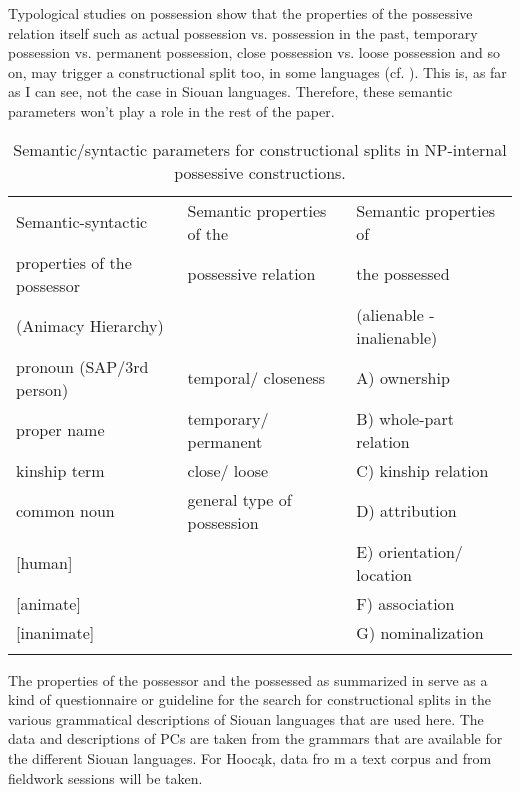 \documentclass[output=paper]{LSP/langsci}
\begin{document}
Typological studies on possession show that the properties of the possessive relation itself such as actual possession vs. possession in the past, temporary possession vs. permanent possession, close possession vs. loose possession and so on, may trigger a constructional split too, in some languages (cf. \citealt[274-6]{Dixon2010}). This is, as far as I can see, not the case in Siouan languages. Therefore, these semantic parameters won't play a role in the rest of the paper. 

\begin{table}
\caption{Semantic/syntactic parameters for constructional splits in NP-internal possessive constructions.} \label{parameters}
\small
\begin{tabular}[h]{ l l l }

\lsptoprule
Semantic-syntactic &	Semantic properties of the & Semantic properties of \\
properties of the possessor & possessive relation &  the possessed \\

(Animacy Hierarchy) & & (alienable - inalienable) \\
\midrule
pronoun (SAP/3rd person) & temporal/ closeness & A) ownership \\
 
proper name & temporary/ permanent & B) whole-part relation \\
 
kinship term & close/ loose & C) kinship relation \\
 
common noun & general type of possession & D) attribution \\
 
{[human]} & & E) orientation/ location \\
 
{[animate]} & & F) association \\
 
{[inanimate]} & & G) nominalization \\
\lspbottomrule
\end{tabular}
\end{table}

The properties of the possessor and the possessed as summarized in  serve as a kind of questionnaire or guideline for the search for constructional splits in the various grammatical descriptions of Siouan languages that are used here. The data and descriptions of PCs are taken from the grammars that are available for the different Siouan languages. For Hoocąk, data fro m a text corpus and from fieldwork sessions will be taken. 
\end{document}
